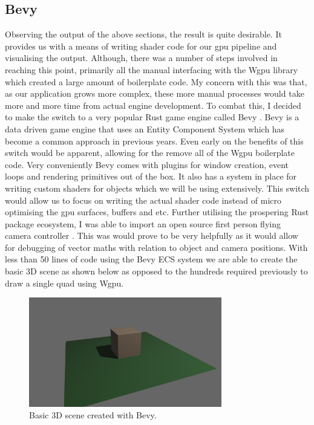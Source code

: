 \documentclass[titlepage]{article}
\begin{document}
\subsection{Bevy}
Observing the output of the above sections, the result is quite desirable. It provides us with a means of writing shader code for our \acrshort{gpu} pipeline and visualising the output. Although, there was a number of steps involved in reaching this point, primarily all the manual interfacing with the Wgpu library which created a large amount of boilerplate code. My concern with this was that, as our application grows more complex, these more manual processes would take more and more time from actual engine development. To combat this, I decided to make the switch to a very popular Rust game engine called Bevy \cite{bevy}. Bevy is a data driven game engine that uses an Entity Component System which has become a common approach in previous years. Even early on the benefits of this switch would be apparent, allowing for the remove all of the Wgpu boilerplate code. Very conveniently Bevy comes with plugins for window creation, event loops and rendering primitives out of the box. It also has a system in place for writing custom shaders for objects which we will be using extensively. This switch would allow us to focus on writing the actual shader code instead of micro optimising the \acrshort{gpu} surfaces, buffers and etc. Further utilising the prospering Rust package ecosystem, I was able to import an open source first person flying camera controller \cite{flycam}. This was would prove to be very helpfully as it would allow for debugging of vector maths with relation to object and camera positions. With less than 50 lines of code using the Bevy ECS system we are able to create the basic 3D scene as shown below as opposed to the hundreds required previously to draw a single quad using Wgpu.

\begin{figure}[htp]
    \centering
    \includegraphics[width=0.75\textwidth]{bevy.png}
    \caption{Basic 3D scene created with Bevy.}
\end{figure}
\FloatBarrier
\end{document}
